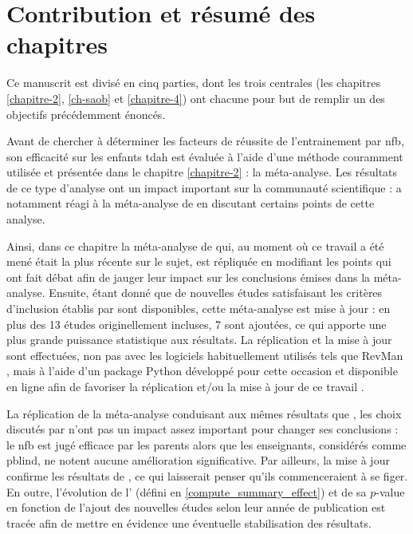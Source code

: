 \section{Contribution et résumé des chapitres}

Ce manuscrit est divisé en cinq parties, dont les trois centrales (les chapitres \ref{chapitre-2}, \ref{ch-saob} et \ref{chapitre-4}) 
ont chacune pour but de remplir un des objectifs précédemment énoncés.

Avant de chercher à déterminer les facteurs de réussite de l'entrainement par \gls{nfb}, son efficacité sur les enfants \gls{tdah} est évaluée à l'aide 
d'une méthode couramment utilisée \citep{Sonuga-Barke2013, Micoulaud2014, Cortese2016} et présentée dans le chapitre \ref{chapitre-2} : la méta-analyse. 
Les résultats de ce type d'analyse ont un impact important sur la communauté scientifique : \citet{Micoulaud2016} a notamment réagi à la méta-analyse de 
\citet{Cortese2016} en discutant certains points de cette analyse. 

Ainsi, dans ce chapitre la méta-analyse de \citet{Cortese2016} qui, au moment où ce travail a été mené était la plus récente sur le sujet, 
est répliquée en modifiant les points qui ont fait débat \citep{Micoulaud2016} afin de jauger leur impact sur les conclusions émises dans la méta-analyse. 
Ensuite, étant donné que de nouvelles études satisfaisant les critères d'inclusion établis par \citet{Cortese2016} sont disponibles, cette méta-analyse 
est mise à jour : en plus des 13 études originellement incluses, 7 sont ajoutées, ce qui apporte une plus grande puissance statistique aux résultats. 
La réplication et la mise à jour sont effectuées, non pas avec les logiciels 
habituellement utilisés tels que RevMan \citep{Revman}, mais à l'aide d'un package Python développé pour cette occasion et disponible en ligne afin de favoriser 
la réplication et/ou la mise à jour de ce travail \citep{Bussalb2019c}. 

La réplication de la méta-analyse conduisant aux mêmes résultats que \citet{Cortese2016}, les choix discutés par \citet{Micoulaud2016} n'ont pas un impact assez
important pour changer ses conclusions : le \gls{nfb} est jugé efficace par les parents alors que les enseignants, considérés comme \gls{pblind}, ne notent aucune
amélioration significative. Par ailleurs, la mise à jour confirme les résultats de \citet{Cortese2016}, ce qui laisserait penser qu'ils commenceraient
à se figer. En outre, l'évolution de l' (défini en \ref{compute_summary_effect}) et de sa $p$-value en fonction de l'ajout des nouvelles études selon
leur année de publication est tracée afin de mettre en évidence une éventuelle stabilisation des résultats. 

